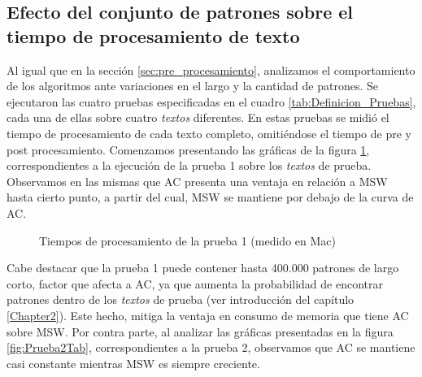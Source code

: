 {\subsection{Efecto del conjunto de patrones sobre el tiempo de procesamiento de texto}
Al igual que en la sección \ref{sec:pre_procesamiento}, analizamos el comportamiento de los algoritmos ante variaciones en el largo y la cantidad de patrones. Se ejecutaron las cuatro pruebas especificadas en el cuadro \ref{tab:Definicion_Pruebas}, cada una de ellas sobre cuatro \emph{textos} diferentes. En estas pruebas se midió el tiempo de procesamiento de cada texto completo, omitiéndose el tiempo de pre y post procesamiento.
Comenzamos presentando las gráficas de la figura \ref{fig:Prueba1Tab}, correspondientes a la ejecución de la prueba 1 sobre los \emph{textos} de prueba. Observamos en las mismas que AC presenta una ventaja en relación a MSW hasta cierto punto, a partir del cual, MSW se mantiene por debajo de la curva de AC. 
\begin{figure}[H]
\centering
\quad
\quad
\quad
\caption{Tiempos de procesamiento de la prueba 1 (medido en Mac)}
\label{fig:Prueba1Tab}
\end{figure}
Cabe destacar que la prueba 1 puede contener hasta 400.000 patrones de largo corto, factor que afecta a AC, ya que aumenta la probabilidad de encontrar patrones dentro de los \emph{textos} de prueba (ver introducción del capítulo \ref{Chapter2}). Este hecho, mitiga la ventaja en consumo de memoria que tiene AC sobre MSW.
Por contra parte, al analizar las gráficas presentadas en la figura \ref{fig:Prueba2Tab}, correspondientes a la prueba 2, observamos que AC se mantiene casi constante mientras MSW es siempre creciente. 
\begin{figure}[H]
\centering
\quad
\quad
\end{figure}}
